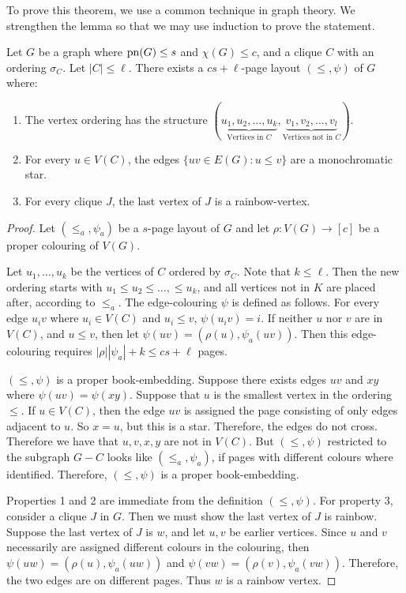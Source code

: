 To prove this theorem, we use a common technique in graph theory. We strengthen the lemma so that we may use induction to prove the statement.
\begin{lemma}\label{lem:Hickingbotham_Lemma}
	Let \(G\) be a graph where \(\operatorname{pn}(G) \leq s\) and \(\chi(G) \leq c\), and a clique \(C\) with an ordering \(\sigma_C\). Let \(|C| \leq \ell\). There exists a \(cs + \ell\)-page layout \((\leq, \psi)\) of \(G\) where:
	\begin{enumerate}
		\item The vertex ordering has the structure \((\underbrace{u_1, u_2, \ldots, u_k}_{\text{Vertices in } C}, \underbrace{v_1, v_2, \ldots, v_l}_{\text{Vertices not in }C})\).
		\item For every \(u \in V(C)\), the edges \(\lbrace uv \in E(G) : u \leq v \rbrace\) are a monochromatic star.
		\item For every clique \(J\), the last vertex of \(J\) is a rainbow-vertex.
	\end{enumerate}
\end{lemma}
\begin{proof}
	Let \((\leq_a, \psi_a)\) be a \(s\)-page layout of \(G\) and let \(\rho: V(G) \rightarrow [c]\) be a proper colouring of \(V(G)\).

	Let \(u_1, \ldots, u_k\) be the vertices of \(C\) ordered by \(\sigma_C\). Note that \(k \leq \ell\). Then the new ordering starts with \(u_1 \leq u_2 \leq \ldots, \leq u_k\), and all vertices not in \(K\) are placed after, according to \(\leq_a\).
	The edge-colouring \(\psi\) is defined as follows. For every edge \(u_i v\) where \(u_i \in V(C)\) and \(u_i \leq v\), \(\psi(u_i v) = i\). If neither \(u\) nor \(v\) are in \(V(C)\), and \(u \leq v\), then let \(\psi(uv) = (\rho(u), \psi_a(uv))\). Then this edge-colouring requires \(|\rho| |\psi_a| + k \leq cs + \ell\) pages.

	\((\leq, \psi)\) is a proper book-embedding. Suppose there exists edges \(uv\) and \(xy\) where \(\psi(uv) = \psi(xy)\). Suppose that \(u\) is the smallest vertex in the ordering \(\leq\). If \(u \in V(C)\), then the edge \(uv\) is assigned the page consisting of only edges adjacent to $u$. So \(x = u\), but this is a star. Therefore, the edges do not cross. Therefore we have that \(u, v, x, y\) are not in \(V(C)\). But \((\leq, \psi)\) restricted to the subgraph $G - C$ looks like \((\leq_a, \psi_a)\), if pages with different colours where identified. Therefore, \((\leq, \psi)\) is a proper book-embedding.  
	\par
	Properties 1 and 2 are immediate from the definition \((\leq, \psi)\). For property 3, consider a clique \(J\) in \(G\). Then we must show the last vertex of \(J\) is rainbow. Suppose the last vertex of \(J\) is \(w\), and let \(u, v\) be earlier vertices. Since \(u\) and \(v\) necessarily are assigned different colours in the colouring, then \(\psi(uw) = (\rho(u), \psi_a(uw))\) and \(\psi(vw) = (\rho(v), \psi_a(vw))\). Therefore, the two edges are on different pages. Thus \(w\) is a rainbow vertex.
\end{proof}

